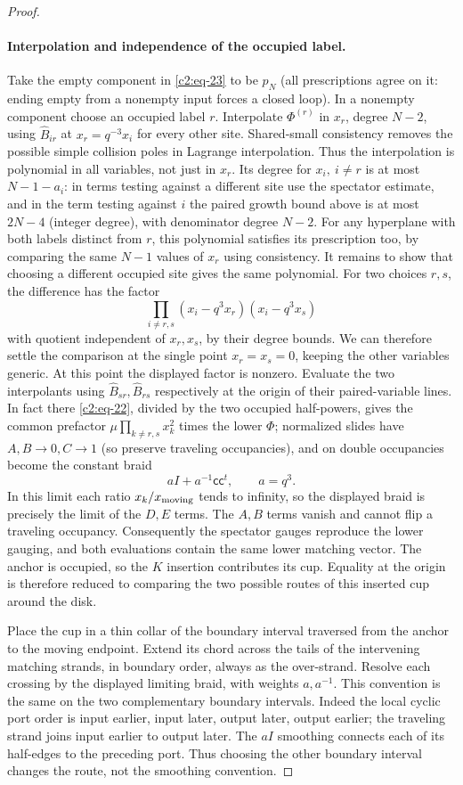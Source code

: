 \begin{proof}
\paragraph{Interpolation and independence of the occupied label.}
Take the empty component in \eqref{c2:eq-23} to be \(p_N\) (all prescriptions agree on it: ending empty from a nonempty input forces a closed loop). In a nonempty component choose an occupied label \(r\). Interpolate \(\Phi^{(r)}\) in \(x_r\), degree \(N-2\), using \(\widehat B_{ir}\) at \(x_r=q^{-3}x_i\) for every other site. Shared-small consistency removes the possible simple collision poles
in Lagrange interpolation. Thus the interpolation is polynomial in all
variables, not just in \(x_r\). Its degree for \(x_i,\ i\ne r\) is at most \(N-1-a_i\): in terms testing against a different site use the spectator estimate, and in the term testing against \(i\) the paired growth bound above is at most \(2N-4\) (integer degree), with denominator degree \(N-2\). For any hyperplane with both labels distinct from \(r\), this polynomial
satisfies its prescription too, by comparing the same \(N-1\) values of \(x_r\) using consistency. It remains to show that choosing a different occupied site gives the
same polynomial. For two choices \(r,s\), the difference has the factor
\[
 \prod_{i\ne r,s}(x_i-q^3 x_r)(x_i-q^3 x_s)
\]
with quotient independent of \(x_r,x_s\), by their degree bounds.
We can therefore settle the comparison at the single point
\(x_r=x_s=0\), keeping the other variables generic. At this point the
displayed factor is nonzero. Evaluate the two interpolants using \(\widehat B_{sr},\widehat B_{rs}\) respectively at the origin of their paired-variable lines. In fact there \eqref{c2:eq-22}, divided by the two occupied half-powers, gives the common prefactor \(\mu\prod_{k\ne r,s}x_k^2\) times the lower \(\Phi\); normalized slides have \(A,B\to0,C\to1\) (so preserve traveling occupancies), and on double occupancies become the constant braid
\[
 aI+a^{-1}\mathsf c\mathsf c^t,\qquad a=q^3 .
\]
In this limit each ratio \(x_k/x_{\rm moving}\) tends to infinity,
so the displayed braid is precisely the limit of the \(D,E\) terms.
The \(A,B\) terms vanish and cannot flip a traveling occupancy.
Consequently the spectator gauges reproduce the lower gauging, and both
evaluations contain the same lower matching vector. The anchor is
occupied, so the \(K\) insertion contributes its cup. Equality at the
origin is therefore reduced to comparing the two possible routes of
this inserted cup around the disk.

Place the cup in a thin collar of the boundary interval traversed from
the anchor to the moving endpoint. Extend its chord across the tails of
the intervening matching strands, in boundary order, always as the
over-strand. Resolve each crossing by the displayed limiting braid,
with weights \(a,a^{-1}\). This convention is the same on the two
complementary boundary intervals. Indeed the local cyclic port order is
input earlier, input later, output later, output earlier; the traveling
strand joins input earlier to output later. The \(aI\) smoothing
connects each of its half-edges to the preceding port. Thus choosing the
other boundary interval changes the route, not the smoothing convention.


\end{proof}

